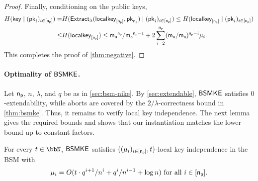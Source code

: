 \begin{proof}
Finally, conditioning on the public keys,
\[
\begin{aligned}
H(\mathsf{key}\mid(\mathsf{pk}_i)_{i\in[\mathsf{n_p}]})
=&
H(\mathsf{Extract}_{\lambda}(\mathsf{localkey}_{[\mathsf{n_p}]},\mathsf{pk}_{\mathsf{n_p}})\mid(\mathsf{pk}_i)_{i\in[\mathsf{n_p}]})
\leq
H(\mathsf{localkey}_{[\mathsf{n_p}]}\mid(\mathsf{pk}_i)_{i\in[\mathsf{n_p}]})\\
\leq&
H(\mathsf{localkey}_{[\mathsf{n_p}]})
\leq
\mathsf{m_u}^{\mathsf{n_p}}/\mathsf{m_a}^{\mathsf{n_p}-1}
+
2\sum_{i=2}^{\mathsf{n_p}}(\mathsf{m_u}/\mathsf{m_a})^{\mathsf{n_p}-i}\mu_i.
\end{aligned}
\]
This completes the proof of \cref{thm:negative}.
\end{proof}



\paragraph{\bf Optimality of ${\mathsf{BSMKE}}$.}
Let $\mathsf{n_p}$, $n$, $\lambda$, and $q$ be as in \cref{sec:bsm-nike}. By \cref{sec:extendable}, ${\mathsf{BSMKE}}$ satisfies $0$-extendability, while aborts are covered by the $2/\lambda$-correctness bound in \cref{thm:bsmke}. Thus, it remains to verify local key independence. The next lemma gives the required bounds and shows that our instantiation matches the lower bound up to constant factors.
\begin{lemma}
\label{lem:localkeyind}
For every $t\in\N$, ${\mathsf{BSMKE}}$ satisfies $((\mu_i)_{i\in[\mathsf{n_p}]},t)$-local key independence in the BSM with
\[
\mu_i=O(t\cdot q^{i+1}/n^i+q^i/n^{i-1}+\log n) \ \mbox{for all $i\in[\mathsf{n_p}]$}.
\]
\end{lemma}

